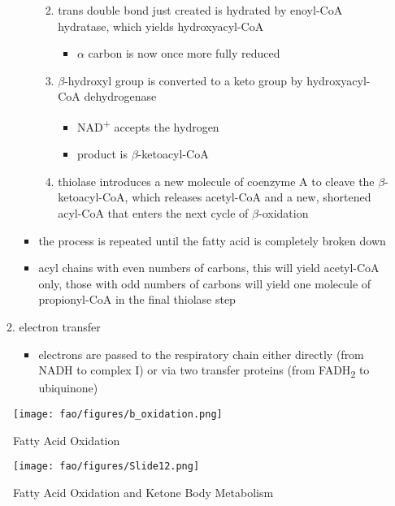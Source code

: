\documentclass[12pt]{scrartcl}
\begin{document}
\begin{itemize}
\begin{enumerate}
\begin{itemize}
\begin{enumerate}
\begin{itemize}
\end{itemize}
\item trans double bond just created is hydrated by enoyl-CoA
hydratase, which yields hydroxyacyl-CoA
\begin{itemize}
\item \(\alpha\) carbon is now once more fully reduced
\end{itemize}
\item \(\beta\)-hydroxyl group is converted to a keto group by
hydroxyacyl-CoA dehydrogenase
\begin{itemize}
\item NAD\textsuperscript{+} accepts the hydrogen
\item product is \(\beta\)-ketoacyl-CoA
\end{itemize}
\item thiolase introduces a new molecule of coenzyme A to cleave
the \(\beta\)-ketoacyl-CoA, which releases acetyl-CoA and a new,
shortened acyl-CoA that enters the next cycle of
\(\beta\)-oxidation
\end{enumerate}
\item the process is repeated until the fatty acid is completely
broken down
\item acyl chains with even numbers of carbons, this will yield
acetyl-CoA only, those with odd numbers of carbons will yield
one molecule of propionyl-CoA in the final thiolase step
\end{itemize}
\item electron transfer
\begin{itemize}
\item electrons are passed to the respiratory chain either directly
(from NADH to complex I) or via two transfer proteins (from
FADH\textsubscript{2} to ubiquinone)
\end{itemize}
\end{enumerate}
\end{itemize}

\begin{figure}[htbp]
\centering
\texttt{[image: fao/figures/b\_oxidation.png]}
\caption{\label{fig:org6cd7a07}Fatty Acid Oxidation}
\end{figure}

\begin{figure}[htbp]
\centering
\texttt{[image: fao/figures/Slide12.png]}
\caption{\label{fig:orga6bb5df}Fatty Acid Oxidation and Ketone Body Metabolism}
\end{figure}
\end{document}

